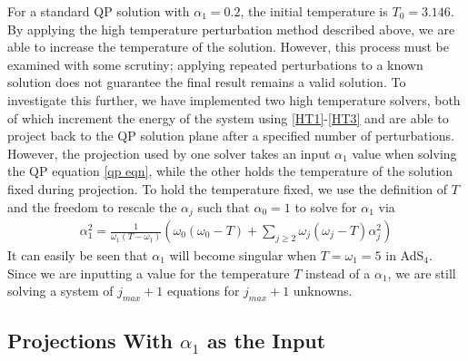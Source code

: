 \documentclass[../PhD.tex]{subfiles}
\begin{document}
For a standard QP solution with $\alpha_1 = 0.2$, the initial temperature is $T_0 = 3.146$. By applying the high temperature perturbation method described above, we are able to increase the temperature of the solution. However, this process must be examined with some scrutiny; applying repeated perturbations to a known solution does not guarantee the final result remains a valid solution. To investigate this further, we have implemented two high temperature solvers, both of which increment the energy of the system using \eqref{HT1}-\eqref{HT3} and are able to project back to the QP solution plane after a specified number of perturbations. However, the projection used by one solver takes an input $\alpha_1$ value when solving the QP equation \eqref{qp eqn}, while the other holds the temperature of the solution fixed during projection. To hold the temperature fixed, we use the definition of $T$ and the freedom to rescale the $\alpha_j$ such that $\alpha_0 = 1$ to solve for $\alpha_1$ via
\begin{align}
\label{a1 eqn}
\alpha_1^2 = \frac{1}{\omega_1 (T - \omega_1)} \left( \omega_0 (\omega_0 - T) + \sum_{j \geq 2} \omega_j (\omega_j - T) \alpha_j^2 \right)
\end{align}
It can easily be seen that $\alpha_1$ will become singular when $T = \omega_1 = 5$ in AdS$_4$. Since we are inputting a value for the temperature $T$ instead of a $\alpha_1$, we are still solving a system of $j_{max} + 1$ equations for $j_{max} + 1$ unknowns.


\subsection{Projections With $\alpha_1$ as the Input}
\label{ssec: a1 projections}
\end{document}
